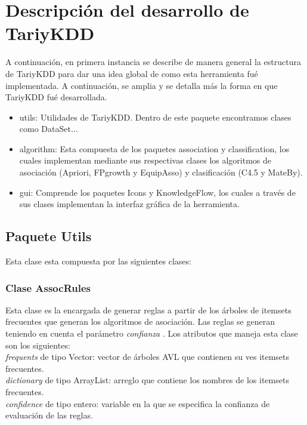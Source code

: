 \section{Descripci\'on del desarrollo de TariyKDD}
A continuaci\'on, en primera instancia se describe de manera general la estructura de TariyKDD para dar una idea
global de como esta herramienta fu\'e implementada. A continuaci\'on, se amplia y se detalla m\'as la forma en 
que TariyKDD fu\'e desarrollada.

\begin{itemize}
\item utils: Utilidades de TariyKDD. Dentro de este paquete encontramos clases como DataSet...
\item algorithm: Esta compuesta de los paquetes association y classification, los cuales implementan mediante sus
respectivas clases los algoritmos de asociaci\'on (Apriori, FPgrowth y EquipAsso) y clasificaci\'on (C4.5 y
MateBy).
\item gui: Comprende los paquetes Icons y KnowledgeFlow, los cuales a trav\'es de sus clases implementan la 
interfaz gr\'afica de la herramienta.
\end{itemize}
\subsection{Paquete Utils}
Esta clase esta compuesta por las siguientes clases:
\subsubsection{Clase AssocRules}

Esta clase es la encargada de generar reglas a partir de los \'arboles de itemsets frecuentes que generan los
algoritmos de asociaci\'on. Las reglas se generan teniendo en cuenta el par\'ametro \textit{confianza} . Los
atributos que maneja esta clase son los siguientes:\\

\textit{frequents }de tipo Vector: vector de \'arboles AVL que contienen  su ves itemsets frecuentes.\\

\textit{dictionary }de tipo ArrayList: arreglo que contiene los nombres de los itemsets frecuentes.\\

\textit{confidence }de tipo entero: variable en la que se especifica la confianza de evaluaci\'on de las reglas.\\

